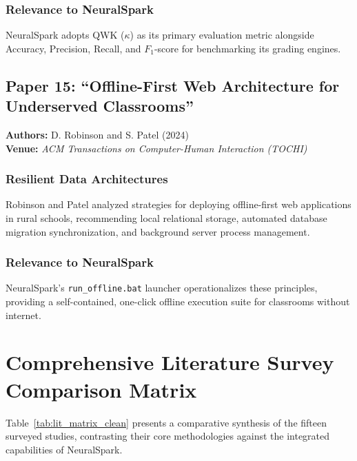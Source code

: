 \subsubsection{Relevance to NeuralSpark}
NeuralSpark adopts QWK ($\kappa$) as its primary evaluation metric alongside Accuracy, Precision, Recall, and $F_1$-score for benchmarking its grading engines.

\subsection{Paper 15: ``Offline-First Web Architecture for Underserved Classrooms''}
\textbf{Authors:} D. Robinson and S. Patel (2024) \cite{robinson2024} \\
\textbf{Venue:} \textit{ACM Transactions on Computer-Human Interaction (TOCHI)}

\subsubsection{Resilient Data Architectures}
Robinson and Patel analyzed strategies for deploying offline-first web applications in rural schools, recommending local relational storage, automated database migration synchronization, and background server process management.

\subsubsection{Relevance to NeuralSpark}
NeuralSpark's \texttt{run\_offline.bat} launcher operationalizes these principles, providing a self-contained, one-click offline execution suite for classrooms without internet.

\section{Comprehensive Literature Survey Comparison Matrix}
Table~\ref{tab:lit_matrix_clean} presents a comparative synthesis of the fifteen surveyed studies, contrasting their core methodologies against the integrated capabilities of NeuralSpark.

